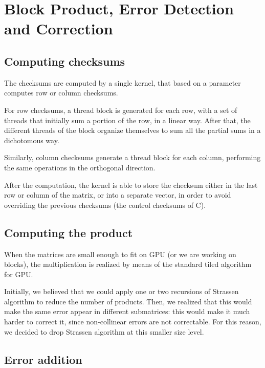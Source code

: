 \section{Block Product, Error Detection and Correction}
\label{sec:block}

\subsection{Computing checksums}

The checksums are computed by a single kernel, that based on a parameter computes row or column checksums.

For row checksums, a thread block is generated for each row, with a set of threads that initially sum a portion of the row, in a linear way.
After that, the different threads of the block organize themselves to sum all the partial sums in a dichotomous way.

Similarly, column checksums generate a thread block for each column, performing the same operations in the orthogonal direction.

After the computation, the kernel is able to store the checksum either in the last row or column of the matrix, or into a separate vector, in order to avoid overriding the previous checksums (the control checksums of C).


\subsection{Computing the product}

When the matrices are small enough to fit on GPU (or we are working on blocks), the multiplication is realized by means of the standard tiled algorithm for GPU.

Initially, we believed that we could apply one or two recursions of Strassen algorithm to reduce the number of products.
Then, we realized that this would make the same error appear in different submatrices: this would make it much harder to correct it, since non-collinear errors are not correctable.
For this reason, we decided to drop Strassen algorithm at this smaller size level.


\subsection{Error addition}

